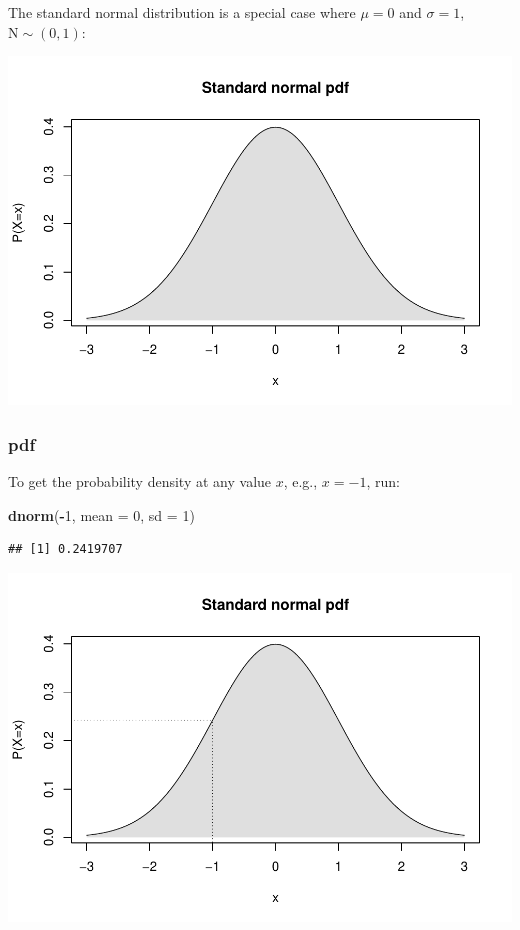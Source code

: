 \documentclass[
  11pt,
]{article}
\newenvironment{Shaded}{\begin{snugshade}}{\end{snugshade}}
\newcommand{\AttributeTok}[1]{\textcolor[rgb]{0.13,0.29,0.53}{#1}}
\newcommand{\DecValTok}[1]{\textcolor[rgb]{0.00,0.00,0.81}{#1}}
\newcommand{\FunctionTok}[1]{\textcolor[rgb]{0.13,0.29,0.53}{\textbf{#1}}}
\newcommand{\NormalTok}[1]{#1}
\newcommand{\SpecialCharTok}[1]{\textcolor[rgb]{0.81,0.36,0.00}{\textbf{#1}}}
\begin{document}
The standard normal distribution is a special case where \(\mu = 0\) and \(\sigma = 1\), \(\text{N} \sim (0, 1)\):

\begin{center}\includegraphics{01-01-lec_files/figure-latex/stdnorm-1-1} \end{center}

\hypertarget{pdf}{%
\subsubsection{pdf}\label{pdf}}

To get the probability density at any value \(x\), e.g., \(x = -1\), run:

\begin{Shaded}
\begin{Highlighting}[]
\FunctionTok{dnorm}\NormalTok{(}\SpecialCharTok{{-}}\DecValTok{1}\NormalTok{, }\AttributeTok{mean =} \DecValTok{0}\NormalTok{, }\AttributeTok{sd =} \DecValTok{1}\NormalTok{)}
\end{Highlighting}
\end{Shaded}

\begin{verbatim}
## [1] 0.2419707
\end{verbatim}

\begin{center}\includegraphics{01-01-lec_files/figure-latex/stdnorm-3-1} \end{center}
\end{document}
